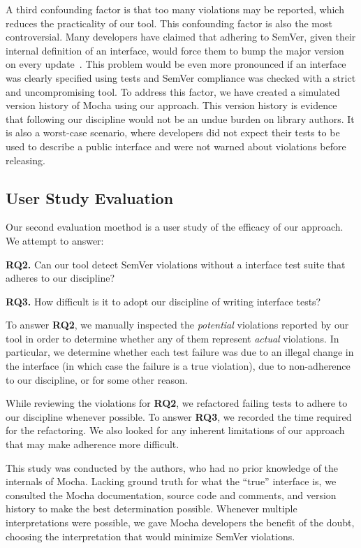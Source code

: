A third confounding factor is that too many violations may be
reported, which reduces the practicality of our tool. This confounding
factor is also the most controversial. Many developers have claimed
that adhering to SemVer, given their internal definition of an
interface, would force them to bump the major version on every
update~\cite{backbone-2888,exoplayer-1382,crawford-not-semver}. This
problem would be even more pronounced if an interface was clearly
specified using tests and SemVer compliance was checked with a strict
and uncompromising tool. To address this factor, we have created a
simulated version history of Mocha using our approach. This version
history is evidence that following our discipline would not be an
undue burden on library authors. It is also a worst-case scenario,
where developers did not expect their tests to be used to describe a
public interface and were not warned about violations before
releasing.

\subsection{User Study Evaluation}
Our second evaluation moethod is a user study of the efficacy of our
approach. We attempt to answer:

{\bf RQ2.} Can our tool detect SemVer violations without a interface
test suite that adheres to our discipline?

{\bf RQ3.} How difficult is it to adopt our discipline of writing interface
tests?

To answer {\bf RQ2}, we manually inspected the {\em potential}
violations reported by our tool in order to determine whether any of
them represent {\em actual} violations. In particular, we determine
whether each test failure was due to an illegal change in the
interface (in which case the failure is a true violation), due to
non-adherence to our discipline, or for some other reason.

While reviewing the violations for {\bf RQ2}, we refactored failing
tests to adhere to our discipline whenever possible. To answer {\bf
  RQ3}, we recorded the time required for the refactoring. We also
looked for any inherent limitations of our approach that may make
adherence more difficult.

This study was conducted by the authors, who had no prior knowledge of
the internals of Mocha. Lacking ground truth for what the ``true''
interface is, we consulted the Mocha documentation, source code and
comments, and version history to make the best determination
possible. Whenever multiple interpretations were possible, we gave
Mocha developers the benefit of the doubt, choosing the interpretation
that would minimize SemVer violations.


